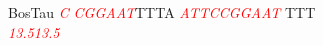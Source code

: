 \documentclass[11pt,twoside,reqno,a4paper]{article}
\begin{document}
{BosTau	\textit{\textcolor{red}{C}}	\textit{\textcolor{red}{C}}\textit{\textcolor{red}{G}}\textit{\textcolor{red}{G}}\textit{\textcolor{red}{A}}\textit{\textcolor{red}{A}}\textit{\textcolor{red}{T}}TTTA	\textit{\textcolor{red}{A}}\textit{\textcolor{red}{T}}\textit{\textcolor{red}{T}}\textit{\textcolor{red}{C}}\textit{\textcolor{red}{C}}\textit{\textcolor{red}{G}}\textit{\textcolor{red}{G}}\textit{\textcolor{red}{A}}\textit{\textcolor{red}{A}}\textit{\textcolor{red}{T}}	TTT\\
\hspace*{7\charwidth}\hspace*{0\charwidth}\textit{\textcolor{red}{13.5}}\hspace*{1\charwidth}\hspace*{1\charwidth}\hspace*{7\charwidth}\textit{\textcolor{red}{13.5}}\hspace*{1\charwidth}\\
\\
}
\end{document}
